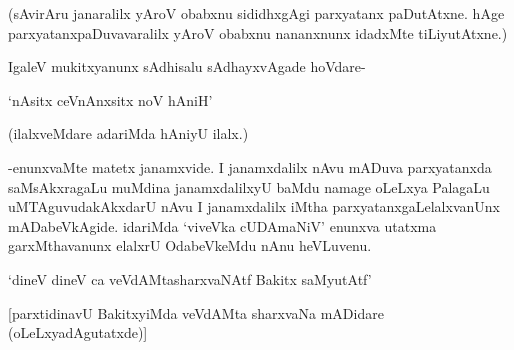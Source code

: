 (sAvirAru janaralilx yAroV obabxnu sididhxgAgi parxyatanx paDutAtxne. hAge parxyatanxpaDuvavaralilx yAroV obabxnu nananxnunx idadxMte tiLiyutAtxne.)

IgaleV mukitxyanunx sAdhisalu sAdhayxvAgade hoVdare-

\begin{shloka}
`nAsitx ceVnAnxsitx noV hAniH'
\end{shloka}

(ilalxveMdare adariMda hAniyU ilalx.)

-enunxvaMte matetx janamxvide. I janamxdalilx nAvu mADuva parxyatanxda saMsAkxragaLu muMdina janamxdalilxyU baMdu namage oLeLxya PalagaLu uMTAguvudakAkxdarU nAvu I janamxdalilx iMtha parxyatanxgaLelalxvanUnx mADabeVkAgide. idariMda `viveVka cUDAmaNiV' enunxva utatxma garxMthavanunx elalxrU OdabeVkeMdu nAnu heVLuvenu.

\begin{shloka}
`dineV dineV ca veVdAMtasharxvaNAtf Bakitx saMyutAtf'
\end{shloka}

[parxtidinavU BakitxyiMda veVdAMta sharxvaNa mADidare (oLeLxyadAgutatxde)]

